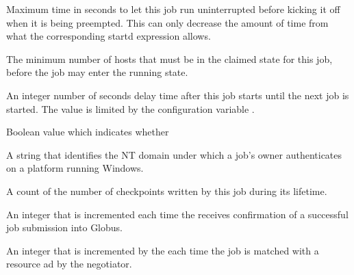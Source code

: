 \begin{description}
\item[\AdAttr{MaxJobRetirementTime}:]  Maximum time in seconds to let this
job run uninterrupted before kicking it off when it is being preempted.
This can only decrease the amount of time from what the corresponding
startd expression allows.

\item[\AdAttr{MinHosts}:]  The minimum number of hosts that must be in
the claimed state for this job, before the job may enter the running state.

\item[\AdAttr{NextJobStartDelay}:]  An integer number of seconds delay time
after this job starts until the next job is started. The value is limited
by the configuration variable .

\item[\AdAttr{NiceUser}:]  Boolean value which indicates whether

\item[\AdAttr{NTDomain}:]  A string that identifies the NT domain under
which a job's owner authenticates on a platform running Windows.

\item[\AdAttr{NumCkpts}:]  A count of the number of checkpoints
written by this job during its lifetime.

\item[\AdAttr{NumGlobusSubmits}:]   An integer that is incremented each
time the  receives confirmation of a successful job
submission into Globus.

\item[\AdAttr{NumJobMatches}:]  An integer that is incremented by the
 each time the job is matched with a resource ad by the
negotiator.


\end{description}
